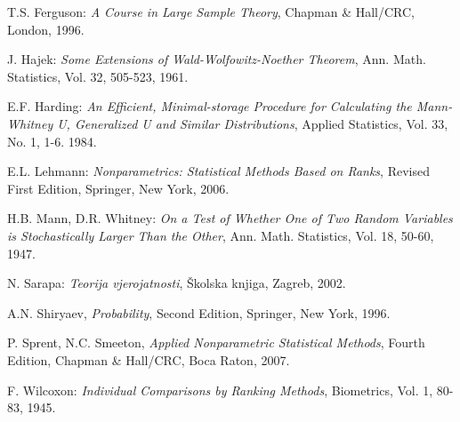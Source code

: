 \documentclass[ a4paper, 12pt]{report}
\theoremstyle{definition}
\numberwithin{Primjer}{chapter}
\renewcommand{\theequation}{\arabic{chapter}.\arabic{section}.\arabic{equation}}
\begin{document}
%
%
\appendix
%
\renewcommand{\theequation}{A.\arabic{equation}}
%
%
\newpage
{}
\begin{thebibliography}{99}

 T.S. Ferguson:
\textit{A Course in Large Sample Theory},
Chapman \& Hall/CRC, London, 1996.

 J. Hajek:
\textit{Some Extensions of Wald-Wolfowitz-Noether Theorem},
Ann. Math. Statistics, Vol. 32, 505-523, 1961.

 E.F. Harding:
\textit{An Efficient, Minimal-storage Procedure for Calculating
the Mann-Whitney U, Generalized U and Similar Distributions},
Applied Statistics, Vol. 33, No. 1, 1-6. 1984.

 E.L. Lehmann:
\textit{Nonparametrics: Statistical Methods Based on Ranks},
Revised First Edition, Springer, New York, 2006.

 H.B. Mann, D.R. Whitney:
\textit{On a Test of Whether One of Two Random
Variables is Stochastically Larger Than the Other},
Ann. Math. Statistics, Vol. 18, 50-60, 1947.

 N. Sarapa: \textit{Teorija vjerojatnosti},
\v{S}kolska knjiga, Zagreb, 2002.

 A.N. Shiryaev, \textit{Probability},
Second Edition, Springer, New York, 1996.

 P. Sprent, N.C. Smeeton,
\textit{Applied Nonparametric Statistical Methods},
Fourth Edition, Chapman \& Hall/CRC, Boca Raton, 2007.

 F. Wilcoxon:
\textit{Individual Comparisons by Ranking Methods},
Biometrics, Vol. 1, 80-83, 1945.

\end{thebibliography}
%
\end{document}
